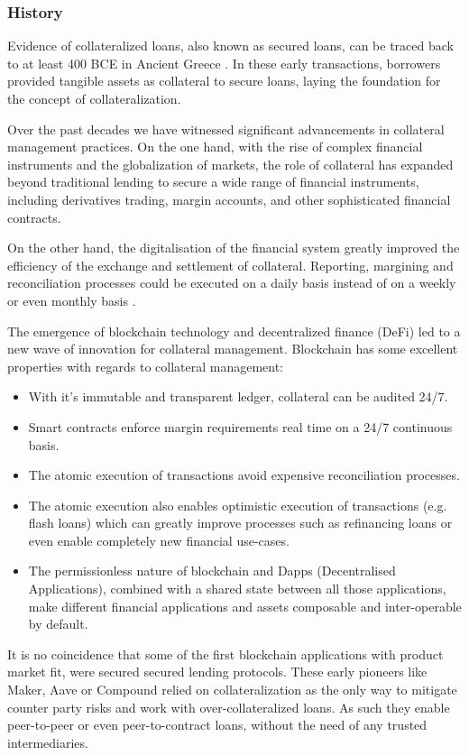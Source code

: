 \documentclass[sigconf,nonacm]{acmart}
\begin{document}
\subsubsection{History}
Evidence of collateralized loans, also known as secured loans, can be traced back to at least 400 BCE in Ancient Greece  \cite{millett2002lending}.
In these early transactions, borrowers provided tangible assets as collateral to secure loans, laying the foundation for the concept of collateralization.

Over the past decades we have witnessed significant advancements in collateral management practices. 
On the one hand, with the rise of complex financial instruments and the globalization of markets, the role of collateral has expanded beyond traditional lending to secure a wide range of financial instruments,
including derivatives trading, margin accounts, and other sophisticated financial contracts.

On the other hand, the digitalisation of the financial system greatly improved the efficiency of the exchange and settlement of collateral.
Reporting, margining and reconciliation processes could be executed on a daily basis instead of on a weekly or even monthly basis \cite{simmons2019collateral}.

The emergence of blockchain technology and decentralized finance (DeFi) led to a new wave of innovation for collateral management.
Blockchain has some excellent properties with regards to collateral management:
\begin{itemize}
    \item With it's immutable and transparent ledger, collateral can be audited 24/7.
    \item Smart contracts enforce margin requirements real time on a 24/7 continuous basis.
    \item The atomic execution of transactions avoid expensive reconciliation processes.
    \item The atomic execution also enables optimistic execution of transactions (e.g. flash loans) which can greatly improve processes such as refinancing loans or even enable completely new financial use-cases.
    \item The permissionless nature of blockchain and Dapps (Decentralised Applications), combined with a shared state between all those applications, make different financial applications and assets composable and inter-operable by default.
\end{itemize}

It is no coincidence that some of the first blockchain applications with product market fit, were secured secured lending protocols.
These early pioneers like Maker\cite{team2017dai}, Aave\cite{thornburg2020aave} or Compound\cite{leshner2019compound} relied on collateralization as the only way to mitigate counter party risks and work with over-collateralized loans.
As such they enable peer-to-peer or even peer-to-contract loans, without the need of any trusted intermediaries.
\end{document}
